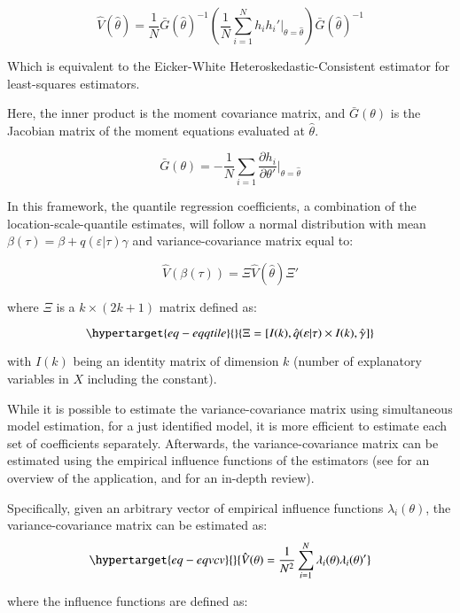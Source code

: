 \documentclass[
  authoryear,
  preprint,
  1p]{elsarticle}
\begin{document}
\[
\hat{V}(\hat\theta)=\frac{1}{N} 
\bar G(\hat\theta)^{-1} 
\left( \frac{1}{N} \sum_{i=1}^N h_i h_i'  \Big|_{\theta=\hat\theta} \right) 
\bar G(\hat\theta)^{-1} 
\]

Which is equivalent to the Eicker-White Heteroskedastic-Consistent
estimator for least-squares estimators.

Here, the inner product is the moment covariance matrix, and
\(\bar{G}(\theta)\) is the Jacobian matrix of the moment equations
evaluated at \(\hat\theta\).

\[\bar{G}(\theta) =-\frac{1}{N} \sum_{i=1} \frac{\partial h_i}{\partial \theta'} \Big|_{\theta=\hat\theta}\]

In this framework, the quantile regression coefficients, a combination
of the location-scale-quantile estimates, will follow a normal
distribution with mean \(\beta(\tau) = \beta+q(\varepsilon|\tau)\gamma\)
and variance-covariance matrix equal to:

\[\hat{V}(\beta(\tau)) = \Xi \hat{V}(\hat\theta) \Xi'
\]

where \(\Xi\) is a \(k \times (2k+1)\) matrix defined as:

\begin{equation}\protect\hypertarget{eq-eqqtile}{}{\Xi = [ I(k), \hat q(\varepsilon|\tau) \times I(k), \hat \gamma ]
}\label{eq-eqqtile}\end{equation}

with \(I(k)\) being an identity matrix of dimension \(k\) (number of
explanatory variables in \(X\) including the constant).

While it is possible to estimate the variance-covariance matrix using
simultaneous model estimation, for a just identified model, it is more
efficient to estimate each set of coefficients separately. Afterwards,
the variance-covariance matrix can be estimated using the empirical
influence functions of the estimators (see \citet{jann_2020} for an
overview of the application, and \citet{hampel2005} for an in-depth
review).

Specifically, given an arbitrary vector of empirical influence functions
\(\lambda_i(\theta)\), the variance-covariance matrix can be estimated
as:
\begin{equation}\protect\hypertarget{eq-eqvcv}{}{\hat{V}(\theta) = \frac{1}{N^2} \sum_{i=1}^N \lambda_i(\theta) \lambda_i(\theta)'
}\label{eq-eqvcv}\end{equation}

where the influence functions are defined as:
\end{document}
